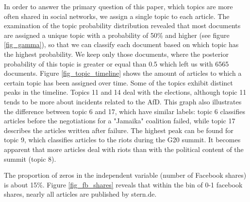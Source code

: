 \documentclass[12pt,a4paper,notitlepage]{article}
\begin{document}
{In order to answer the primary question of this paper, which topics are more often shared in social networks, we assign a single topic to each article. The examination of the topic probability distribution revealed that most documents are assigned a unique topic with a probability of 50\% and higher (see figure \ref{fig_gamma}), so that we can classify each document based on which topic has the highest probability. We keep only those documents, where the posterior probability of this topic is greater or equal than 0.5 which left us with 6565 documents. Figure \ref{fig_topic_timeline} shows the amount of articles to which a certain topic has been assigned over time. Some of the topics exhibit distinct peaks in the timeline. Topics 11 and 14 deal with the elections, although topic 11 tends to be more about incidents related to the AfD. This graph also illustrates the difference between topic 6 and 17, which have similar labels: topic 6 classifies articles before the negotiations for a "Jamaika" coalition failed, while topic 17 describes the articles written after failure. The highest peak can be found for topic 9, which classifies articles to the riots during the G20 summit. It becomes apparent that more articles deal with riots than with the political content of the summit (topic 8). 

The proportion of zeros in the independent variable (number of Facebook shares) is about 15\%. Figure \ref{fig_fb_shares} reveals that within the bin of 0-1 facebook shares, nearly all articles are published by stern.de. 

}
\end{document}
